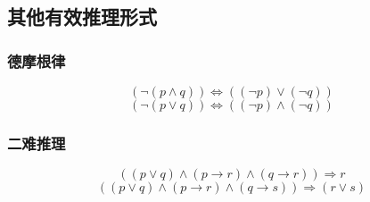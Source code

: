 \documentclass[12pt,onecolumn,a4paper]{book}
\numberwithin{table}{subsection}
\numberwithin{equation}{subsection}
\begin{document}
\subsection{其他有效推理形式}

\subsubsection{德摩根律}

\begin{equation}
    (\neg (p \wedge q)) \Leftrightarrow ((\neg p)\vee(\neg q))
\end{equation}
\begin{equation}
    (\neg (p \vee q)) \Leftrightarrow ((\neg p)\wedge(\neg q))
\end{equation}

\subsubsection{二难推理}

\begin{equation}
    ((p \vee q) \wedge (p \rightarrow r) \wedge (q \rightarrow r)) \Rightarrow r
\end{equation}
\begin{equation}
    ((p \vee q) \wedge (p \rightarrow r) \wedge (q \rightarrow s)) \Rightarrow (r \vee s)
\end{equation}
\end{document}

